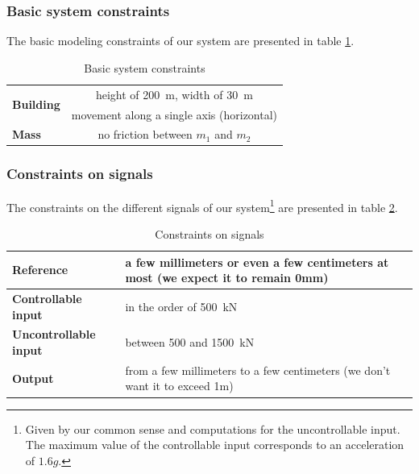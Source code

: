 \subsubsection{Basic system constraints}
The basic modeling constraints of our system are presented in table \ref{tab:constraints_assumptions_limitations}.\par
\begin{table}[H]
    \centering
    \begin{tabular}{|l|c|}
        \hline
        \multirow{2}{*}{{\bf Building}} & height of \SI{200}{\meter}, width of \SI{30}{\meter}\\ & movement along a single axis (horizontal)\\\hline
        {\bf Mass} & no friction between $m_1$ and $m_2$\\ \hline
    \end{tabular}
    \caption{Basic system constraints}
    \label{tab:constraints_assumptions_limitations}
\end{table}

\subsubsection{Constraints on signals}
The constraints on the different signals of our system\footnote{Given by our common sense and computations for the uncontrollable input. The maximum value of the controllable input corresponds to an acceleration of $1.6g$.} are presented in table \ref{tab:constraints_signals}.
\begin{table}[H]
    \centering
    \begin{tabular}{|l|m{8cm}|}
        \hline
        {\bf Reference} & a few millimeters or even a few centimeters at most (we expect it to remain 0mm)\\ \hline
        {\bf Controllable input} & in the order of \SI{500}{\kilo\newton}\\ \hline
        {\bf Uncontrollable input} & between \num{500} and \SI{1500}{\kilo\newton}\\ \hline
        {\bf Output} & from a few millimeters to a few centimeters (we don't want it to exceed 1m)\\ \hline
    \end{tabular}
    \caption{Constraints on signals}
    \label{tab:constraints_signals}
\end{table}

